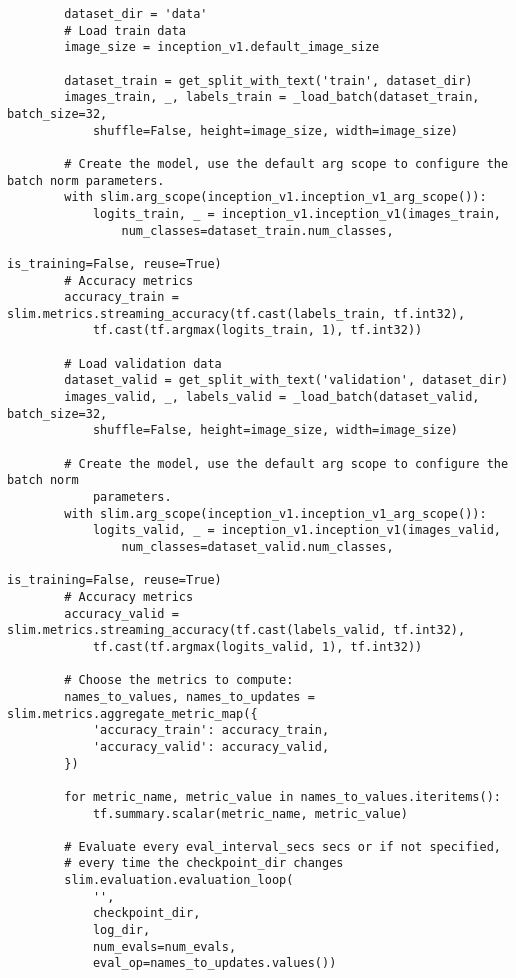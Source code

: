 \begin{lstlisting}
        dataset_dir = 'data'
        # Load train data
        image_size = inception_v1.default_image_size

        dataset_train = get_split_with_text('train', dataset_dir)
        images_train, _, labels_train = _load_batch(dataset_train, batch_size=32, 
            shuffle=False, height=image_size, width=image_size)

        # Create the model, use the default arg scope to configure the batch norm parameters.
        with slim.arg_scope(inception_v1.inception_v1_arg_scope()):
            logits_train, _ = inception_v1.inception_v1(images_train, 
                num_classes=dataset_train.num_classes, 
                                                        is_training=False, reuse=True)
        # Accuracy metrics
        accuracy_train = slim.metrics.streaming_accuracy(tf.cast(labels_train, tf.int32),
            tf.cast(tf.argmax(logits_train, 1), tf.int32))

        # Load validation data
        dataset_valid = get_split_with_text('validation', dataset_dir)
        images_valid, _, labels_valid = _load_batch(dataset_valid, batch_size=32, 
            shuffle=False, height=image_size, width=image_size)

        # Create the model, use the default arg scope to configure the batch norm 
            parameters.
        with slim.arg_scope(inception_v1.inception_v1_arg_scope()):
            logits_valid, _ = inception_v1.inception_v1(images_valid, 
                num_classes=dataset_valid.num_classes, 
                                                        is_training=False, reuse=True)
        # Accuracy metrics
        accuracy_valid = slim.metrics.streaming_accuracy(tf.cast(labels_valid, tf.int32), 
            tf.cast(tf.argmax(logits_valid, 1), tf.int32))

        # Choose the metrics to compute:
        names_to_values, names_to_updates = slim.metrics.aggregate_metric_map({
            'accuracy_train': accuracy_train,
            'accuracy_valid': accuracy_valid,
        })

        for metric_name, metric_value in names_to_values.iteritems():
            tf.summary.scalar(metric_name, metric_value)

        # Evaluate every eval_interval_secs secs or if not specified,
        # every time the checkpoint_dir changes
        slim.evaluation.evaluation_loop(
            '',
            checkpoint_dir,
            log_dir,
            num_evals=num_evals,
            eval_op=names_to_updates.values())


\end{lstlisting}
